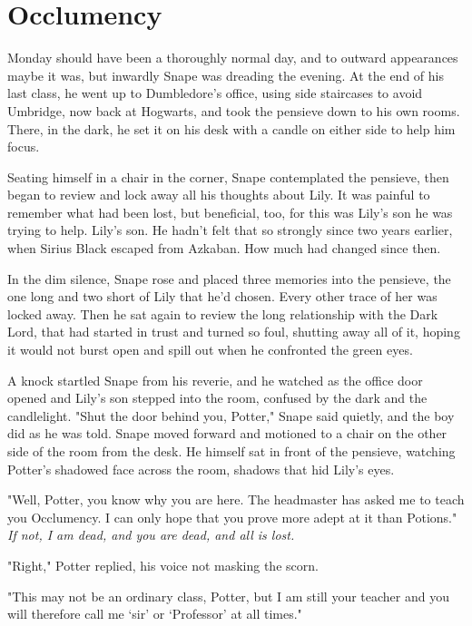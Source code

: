 
\chapter{Occlumency}

Monday should have been a thoroughly normal day, and to outward appearances maybe it was, but inwardly Snape was dreading the evening. At the end of his last class, he went up to Dumbledore's office, using side staircases to avoid Umbridge, now back at Hogwarts, and took the pensieve down to his own rooms. There, in the dark, he set it on his desk with a candle on either side to help him focus.

Seating himself in a chair in the corner, Snape contemplated the pensieve, then began to review and lock away all his thoughts about Lily. It was painful to remember what had been lost, but beneficial, too, for this was Lily's son he was trying to help. Lily's son. He hadn't felt that so strongly since two years earlier, when Sirius Black escaped from Azkaban. How much had changed since then.

In the dim silence, Snape rose and placed three memories into the pensieve, the one long and two short of Lily that he'd chosen. Every other trace of her was locked away. Then he sat again to review the long relationship with the Dark Lord, that had started in trust and turned so foul, shutting away all of it, hoping it would not burst open and spill out when he confronted the green eyes.

A knock startled Snape from his reverie, and he watched as the office door opened and Lily's son stepped into the room, confused by the dark and the candlelight. "Shut the door behind you, Potter," Snape said quietly, and the boy did as he was told. Snape moved forward and motioned to a chair on the other side of the room from the desk. He himself sat in front of the pensieve, watching Potter's shadowed face across the room, shadows that hid Lily's eyes.

"Well, Potter, you know why you are here. The headmaster has asked me to teach you Occlumency. I can only hope that you prove more adept at it than Potions." \emph{If not, I am dead, and you are dead, and all is lost.}

"Right," Potter replied, his voice not masking the scorn.

"This may not be an ordinary class, Potter, but I am still your teacher and you will therefore call me `sir' or `Professor' at all times."

